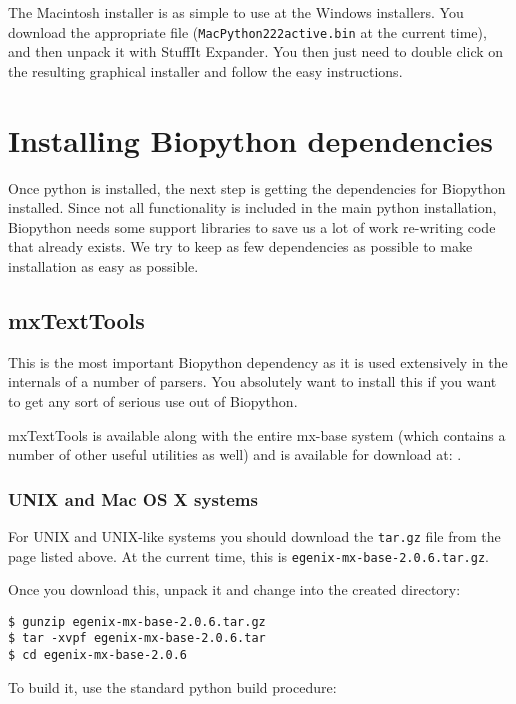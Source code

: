 \documentclass{article}
\begin{document}
The Macintosh installer is as simple to use at the Windows installers.
You download the appropriate file (\verb|MacPython222active.bin| at the
current time), and then unpack it with StuffIt Expander. You then just
need to double click on the resulting graphical installer and follow the
easy instructions.

\section{Installing Biopython dependencies}

Once python is installed, the next step is getting the dependencies
for Biopython installed. Since not all functionality is included in the
main python installation, Biopython needs some support libraries to save
us a lot of work re-writing code that already exists. We try to keep
as few dependencies as possible to make installation as easy as
possible.

\subsection{mxTextTools}

This is the most important Biopython dependency as it is used
extensively in the internals of a number of parsers. You absolutely want
to install this if you want to get any sort of serious use out of
Biopython.


mxTextTools is available along with the entire mx-base system (which
contains a number of other useful utilities as well) and is available
for download at:
.

\subsubsection{UNIX and Mac OS X systems}

For UNIX and UNIX-like systems you should download the \verb|tar.gz|
file from the page listed above. At the current time, this is
\verb|egenix-mx-base-2.0.6.tar.gz|.

Once you download this, unpack it and change into the created directory:

\begin{verbatim}
$ gunzip egenix-mx-base-2.0.6.tar.gz 
$ tar -xvpf egenix-mx-base-2.0.6.tar
$ cd egenix-mx-base-2.0.6
\end{verbatim}

To build it, use the standard python build procedure:
\end{document}

